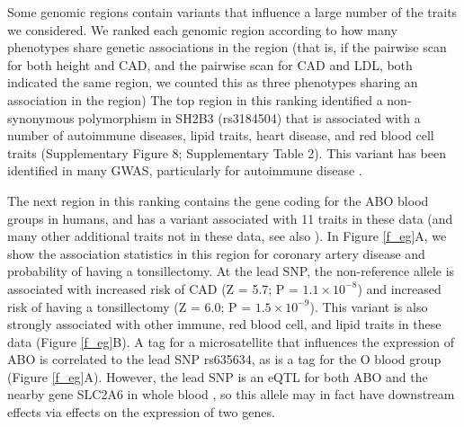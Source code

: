 \documentclass[11pt,titlepage]{article}
\begin{document}
Some genomic regions contain variants that influence a large number of the traits we considered. 
We ranked each genomic region according to how many phenotypes share genetic associations in the region (that is, if the pairwise scan for both height and CAD, and the pairwise scan for CAD and LDL, both indicated the same region, we counted this as three phenotypes sharing an association in the region)
The top region in this ranking identified a non-synonymous polymorphism in SH2B3 (rs3184504) that is associated with a number of autoimmune diseases, lipid traits, heart disease, and red blood cell traits (Supplementary Figure 8; Supplementary Table 2). 
This variant has been identified in many GWAS, particularly for autoimmune disease \citep{Richard-Miceli:2012aa}.

The next region in this ranking contains the gene coding for the ABO blood groups in humans, and has a variant associated with 11 traits in these data (and many other additional traits not in these data, see also \citep{Schunkert:2011aa, Wessel:2015aa, Franchini:2015aa}). 
In Figure \ref{f_eg}A, we show the association statistics in this region for coronary artery disease and probability of having a tonsillectomy.
At the lead SNP, the non-reference allele is associated with increased risk of CAD (Z = 5.7; P = $1.1 \times 10^{-8}$) and increased risk of having a tonsillectomy (Z = 6.0; P = $1.5 \times 10^{-9}$). 
This variant is also strongly associated with other immune, red blood cell, and lipid traits in these data (Figure \ref{f_eg}B). 
A tag for a microsatellite that influences the expression of ABO \citep{Kominato:1997aa} is correlated to the lead SNP rs635634, as is a tag for the O blood group (Figure \ref{f_eg}A). 
However, the lead SNP is an eQTL for both ABO and the nearby gene SLC2A6 in whole blood \citep{Wessel:2015aa}, so this allele may in fact have downstream effects via effects on the expression of two genes.
\end{document}
